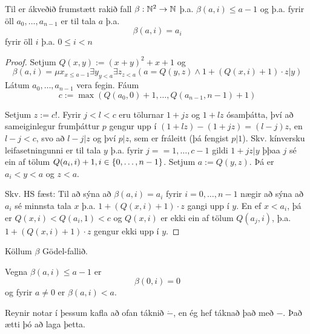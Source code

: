 \documentclass[12pt]{book}
\begin{document}
\begin{setn}
  Til er ákveðið frumstætt rakið fall $\beta: \mathbb{N}^2 \to \mathbb{N}$
  þ.a. $\beta (a,i) \leq a - 1$ og þ.a. fyrir öll $a_0, \dotsc, a_{n-1}$ er til
  tala $a$ þ.a.
  \[\beta(a,i) = a_i \]
  fyrir öll $i$ þ.a. $0 \leq i < n$
  \begin{proof}
    Setjum $Q(x,y) := (x+y)^2 + x +1$ og
    \[ \beta(a,i) = \mu x_{x \leq a - 1} \exists y_{y<a} \exists z_{z<a} (a = Q(y,z) \wedge 1 + (Q(x,i)+1) \cdot z | y ) \]
    Látum $a_0, \dotsc, a_{n-1}$ vera fegin. Fáum
    \[ c:= \max (Q(a_0,0) + 1, \dotsc, Q(a_{n-1},n-1) +1 ) \]
    
    Setjum $ z := c!$. Fyrir $j < l < c$ eru tölurnar
    $1 +jz$ og $1 + lz$ ósamþátta, því að sameiginlegur frumþáttur
    $p$ gengur upp í $(1+lz) - (1+jz) = (l-j)z$, en $l-j < c$, svo að
    $l-j | z$ og því $p|z$, sem er fráleitt (þá fengist $p | 1$). Skv.
    kínversku leifasetningunni er til tala $y$ þ.a. fyrir $j = =1, \dotsc, c-1$
    gildi $1+jz|y$ þþaa $j$ sé ein af tölum $Q(a_i,i)+1, i \in \{0,\dotsc,n-1\}$.
    Setjum $a := Q(y,z)$. Þá er $a_i < y < a$ og $ z < a$.

    Skv. HS fæst: Til að sýna að $\beta(a,i) = a_i$ fyrir $i = 0, \dotsc, n-1$
    nægir að sýna að $a_i$ sé minnsta tala $x$ þ.a.
    $1+(Q(x,i)+1)\cdot z$ gangi upp í $y$. En ef $x < a_i$,
    þá er $Q(x,i) < Q(a_i,1) < c$ og $Q(x,i)$ er
    ekki ein af tölum $Q(a_j,i)$, þ.a. $1 + (Q(x,i)+1)\cdot z$
    gengur ekki upp í $y$.
  \end{proof}
\end{setn}

\begin{skgr}
  Köllum $\beta$ Gödel-fallið.

\end{skgr}

\begin{ath}
  
  Vegna $\beta(a,i) \leq a - 1$ er 
  \[\beta(0,i) = 0\]
  og fyrir $a \neq 0$ er $\beta(a,i) < a$.
\end{ath}

\begin{ath}
  Reynir notar í þessum kafla að ofan táknið $\dot{-}$,
  en ég hef táknað það með $-$. Það ætti þó að laga þetta.
\end{ath}
\end{document}
